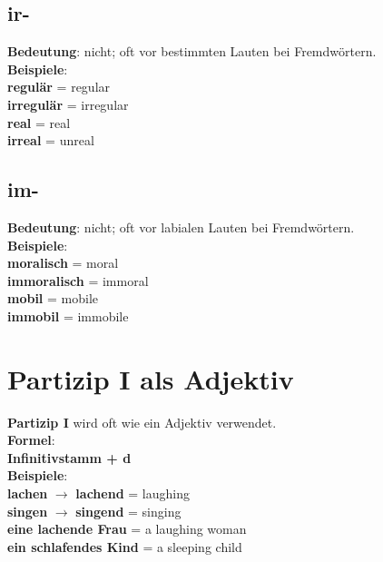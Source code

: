 \documentclass[a4paper]{article}
\begin{document}
        \subsection{ir-}
            \textbf{Bedeutung}: nicht; oft vor bestimmten Lauten bei Fremdw\"ortern.\\
            \textbf{Beispiele}:\\
            \textbf{regul\"ar} = regular\\
            \textbf{irregul\"ar} = irregular\\
            \textbf{real} = real\\
            \textbf{irreal} = unreal\\
        
        \subsection{im-}
            \textbf{Bedeutung}: nicht; oft vor labialen Lauten bei Fremdw\"ortern.\\
            \textbf{Beispiele}:\\
            \textbf{moralisch} = moral\\
            \textbf{immoralisch} = immoral\\
            \textbf{mobil} = mobile\\
            \textbf{immobil} = immobile\\
    
    
    \section{Partizip I als Adjektiv}
        \textbf{Partizip I} wird oft wie ein Adjektiv verwendet.\\
        \textbf{Formel}:\\
        \textbf{Infinitivstamm + d}\\
        \textbf{Beispiele}:\\
        \textbf{lachen} $\rightarrow$ \textbf{lachend} = laughing\\
        \textbf{singen} $\rightarrow$ \textbf{singend} = singing\\
        \textbf{eine lachende Frau} = a laughing woman\\
        \textbf{ein schlafendes Kind} = a sleeping child\\
    
    
\end{document}

